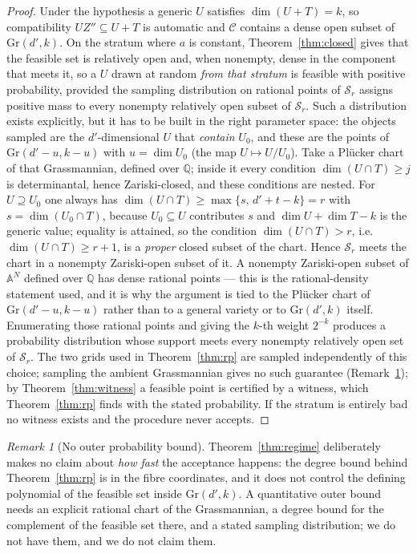 \documentclass[journal]{IEEEtran}
\theoremstyle{plainn}
\theoremstyle{remark}
\newtheorem{remark}[thm]{Remark}
\begin{document}
\begin{proof}
Under the hypothesis a generic $U$ satisfies $\dim(U+T)=k$, so compatibility $UZ''\subseteq U+T$ is
automatic and $\mathcal C$ contains a dense open subset of $\mathrm{Gr}(d',k)$. On the stratum where $a$ is constant, Theorem~\ref{thm:closed} gives that the feasible set is relatively
open and, when nonempty, dense in the component that meets it, so a $U$ drawn at random \emph{from that
stratum} is feasible with positive probability, provided the sampling distribution on rational points of $\mathcal S_r$ assigns positive mass to every
nonempty relatively open subset of $\mathcal S_r$. Such a distribution exists explicitly, but it has to be built in the right parameter space: the objects
sampled are the $d'$-dimensional $U$ that \emph{contain} $U_0$, and these are the points of
$\mathrm{Gr}(d'-u,k-u)$ with $u=\dim U_0$ (the map $U\mapsto U/U_0$). Take a Plücker chart of that
Grassmannian, defined over $\mathbb Q$; inside it every condition $\dim(U\cap T)\ge j$ is determinantal, hence Zariski-closed, and these
conditions are nested. For $U\supseteq U_0$ one always has $\dim(U\cap T)\ge\max\{s,\,d'+t-k\}=r$
with $s=\dim(U_0\cap T)$, because $U_0\subseteq U$ contributes $s$ and $\dim U+\dim T-k$ is the generic
value; equality is attained, so the condition $\dim(U\cap T)>r$, i.e.\ $\dim(U\cap T)\ge r+1$, is a
\emph{proper} closed subset of the chart. Hence $\mathcal S_r$ meets the chart in a nonempty Zariski-open
subset of it. A nonempty Zariski-open subset of $\mathbb A^{N}$ defined over
$\mathbb Q$ has dense rational points — this is the rational-density statement used, and it is why the
argument is tied to the Plücker chart of $\mathrm{Gr}(d'-u,k-u)$ rather than to a general variety or to
$\mathrm{Gr}(d',k)$ itself. Enumerating those rational points and giving the $k$-th
weight $2^{-k}$ produces a probability distribution whose support meets every nonempty relatively open
set of $\mathcal S_r$. The two grids used in
Theorem~\ref{thm:rp} are sampled independently of this choice; sampling the ambient Grassmannian gives no
such guarantee (Remark~\ref{rem:no-outer-bound}); by Theorem~\ref{thm:witness} a
feasible point is certified by a witness, which Theorem~\ref{thm:rp} finds with the stated
probability. If the stratum is entirely bad no witness exists and the procedure never accepts.
\end{proof}

\begin{remark}[No outer probability bound]\label{rem:no-outer-bound}
Theorem~\ref{thm:regime} deliberately makes no claim about \emph{how fast} the acceptance happens: the
degree bound behind Theorem~\ref{thm:rp} is in the fibre coordinates, and it does not control the
defining polynomial of the feasible set inside $\mathrm{Gr}(d',k)$. A quantitative outer bound needs an
explicit rational chart of the Grassmannian, a degree bound for the complement of the feasible set
there, and a stated sampling distribution; we do not have them, and we do not claim them.
\end{remark}
\end{document}
